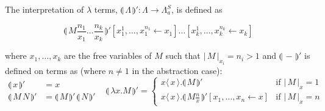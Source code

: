 \documentclass[runningheads]{llncs}
\newcommand{\FALC}{\Lambda^{S}_{a}}
\newcommand{\abs}[2]{\lambda #1 . #2}
\newcommand{\app}[2]{#1 \, #2}
\newcommand{\fake}[3]{#1 \langle \, #2 \, \rangle . #3}
\newcommand{\share}[3]{#1 [#2 \leftarrow #3]}
\newcommand{\size}[1]{\vert \, #1 \, \vert}
\newcommand{\compile}[1]{\llparenthesis \, #1 \, \rrparenthesis}
\begin{document}
\begin{definition}[Compilation]
\label{def:compile}
The interpretation of $\lambda$ terms, $\compile{\Lambda}' : \Lambda \rightarrow \FALC$, is defined as

\[ \compile{M \frac{n_{1}}{x_{1}} \dots \frac{n_{k}}{x_{k}} }' \share{}{x^{1}_{1}, \dots, x^{n_{1}}_{1}}{x_{1}} \dots \share{}{x^{1}_{k}, \dots, x^{n_{k}}_{k}}{x_{k}} \]

where $x_{1}, \dots, x_{k}$ are the free variables of $M$ such that $\size{M}_{x_{i}} = n_{i} > 1$ and $\compile{-}'$ is defined on terms as (where $n \neq 1$ in the abstraction case):
\[
\begin{aligned}
	\compile{x}' &= x \\
	\compile{\app{M}{N}}' &= \app{\compile{M}'}{\compile{N}'}
\end{aligned}
\, \, \, \, \,
	\compile{\abs{x}{M}}' =
	\begin{cases}
		\fake{x}{x}{\compile{M}'} & \text{if } \size{M}_{x} = 1 \\
		\fake{x}{x}{\share{\compile{M \frac{n}{x}}'}{x_{1}, \dots, x_{n}}{x}} & \text{if } \size{M}_{x} = n
	\end{cases}
\]

\end{definition}
\end{document}
